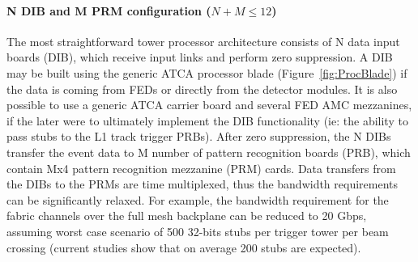 \paragraph{N DIB and M PRM configuration ($N+M \le 12$)}

\noindent The most straightforward tower processor architecture consists of N data input boards (DIB), which receive input links and perform zero suppression.  A DIB may be built using the generic ATCA processor blade (Figure~\ref{fig:ProcBlade}) if the data is coming from FEDs or directly from the detector modules.  
It is also possible to use a generic ATCA carrier board and several FED AMC mezzanines, if the later were to ultimately implement the DIB functionality (ie: the ability to pass stubs to the L1 track trigger PRBs).
After zero suppression, the N DIBs transfer the event data to M number of pattern recognition boards (PRB), which contain Mx4 pattern recognition mezzanine (PRM) cards.  Data transfers from the DIBs to the PRMs are time multiplexed, thus the bandwidth requirements can be significantly relaxed. For example, the bandwidth requirement for the fabric channels over the full mesh backplane can be reduced to 20 Gbps, assuming worst case scenario of 500 32-bits stubs per trigger tower per beam crossing (current studies show that on average 200 stubs are expected). 




